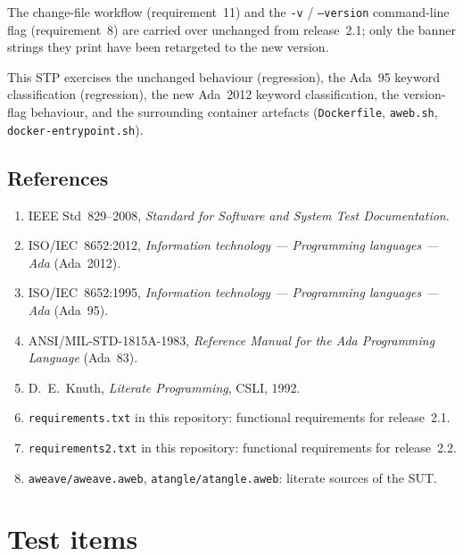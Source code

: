 \documentclass[11pt]{article}
\begin{document}
The change-file workflow (requirement~11) and the \texttt{-v} /
\texttt{--version} command-line flag (requirement~8) are carried over
unchanged from release~2.1; only the banner strings they print have
been retargeted to the new version.

This STP exercises the unchanged behaviour (regression), the Ada~95
keyword classification (regression), the new Ada~2012 keyword
classification, the version-flag behaviour, and the surrounding
container artefacts (\texttt{Dockerfile}, \texttt{aweb.sh},
\texttt{docker-entrypoint.sh}).

\subsection{References}
\begin{enumerate}[label=R\arabic*., leftmargin=2.5em]
  \item IEEE Std~829--2008, \emph{Standard for Software and System Test
        Documentation}.
  \item ISO/IEC~8652:2012, \emph{Information technology --- Programming
        languages --- Ada} (Ada~2012).
  \item ISO/IEC~8652:1995, \emph{Information technology --- Programming
        languages --- Ada} (Ada~95).
  \item ANSI/MIL-STD-1815A-1983, \emph{Reference Manual for the Ada
        Programming Language} (Ada~83).
  \item D.~E.~Knuth, \emph{Literate Programming}, CSLI, 1992.
  \item \texttt{requirements.txt} in this repository: functional
        requirements for release~2.1.
  \item \texttt{requirements2.txt} in this repository: functional
        requirements for release~2.2.
  \item \texttt{aweave/aweave.aweb}, \texttt{atangle/atangle.aweb}:
        literate sources of the SUT.
\end{enumerate}

\section{Test items}
\end{document}
